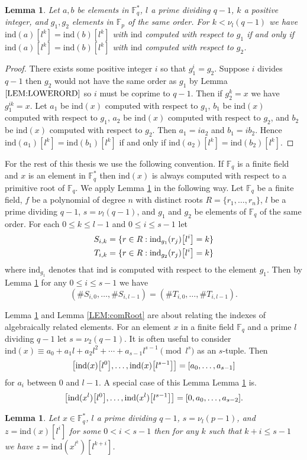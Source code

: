\documentclass{article}
\let\originalleft\left
\let\originalright\right
\renewcommand{\left}{\mathopen{}\mathclose\bgroup\originalleft}
\renewcommand{\right}{\aftergroup\egroup\originalright}
\newcounter{dummy} \numberwithin{dummy}{section}
\theoremstyle{plain}
\newtheorem{lem}[dummy]{Lemma}
\theoremstyle{definition}
\def\Fp {{ \mathbb{F} _ {p} }}
\def\Fq {{ \mathbb{F} _ {q} }}
\def\FQ {{ \mathbb{F}^* _ {q} }}
\def\ind {{ \mathrm{ind} }}
\def\indLa {{\ind (x) \left[l^0\right] }}
\def\indLd {{\ind (x) \left[l^{s-1}\right] }}
\def\indLat {{\ind (x^l) \left[l^0\right] }}
\def\indLdt {{\ind (x^l) \left[l^{s-1}\right] }}
\begin{document}
		\begin{lem}
		\label{LEM:NOGEN}
		    Let $a,b$ be elements in $\FQ$, $l$ a prime dividing $q-1$, $k$ a positive integer, and $g_1,g_2$ elements in $\Fp$ of the same order. For $k<\nu_l(q-1)$ we have $\ind(a)[l^k]=\ind(b)[l^k]$ with $\ind$ computed with respect to $g_1$ if and only if $\ind(a)[l^k]=\ind(b)[l^k]$ with $\ind$ computed with respect to $g_2$.
		\end{lem}
				
		\begin{proof}
		    There exists some positive integer $i$ so that $g_1^i=g_2$. Suppose $i$ divides $q-1$ then $g_2$ would not have the same order as $g_1$ by Lemma $\ref{LEM:LOWERORD}$ so $i$ must be coprime to $q-1$. Then if $g_2^k=x$ we have $g_1^{ik}=x$. Let $a_1$ be $\ind(x)$ computed with respect to $g_1$, $b_1$ be $\ind(x)$ computed with respect to $g_1$, $a_2$ be $\ind(x)$ computed with respect to $g_2$, and $b_2$ be $\ind(x)$ computed with respect to $g_2$. Then $a_1=ia_2$ and $b_1=ib_2$. Hence $\ind(a_1)[l^k]=\ind(b_1)[l^k]$ if and only if $\ind(a_2)[l^k]=\ind(b_2)[l^k]$.
				
		\end{proof}
		
	  For the rest of this thesis we use the following convention. If $\Fq$ is a finite field and $x$ is an element in $\FQ$ then $\ind(x)$ is always computed with respect to a primitive root of $\Fq$. We apply Lemma \ref{LEM:NOGEN} in the following way. Let $\Fq$ be a finite field, $f$ be a polynomial of degree $n$ with distinct roots $R=\{ r_1,\ldots,r_n \}$, $l$ be a prime dividing $q-1$, $s=\nu_l(q-1)$, and $g_1$ and $g_2$ be elements of $\Fq$ of the same order. For each $0 \leq k \leq l-1$ and $0 \leq i \leq s-1$ let	
		\begin{alignat*}{2}
		    S_{i,k} &= \{ r\in R : \ind_{g_1}(r_j)\left[l^i\right] = k \} \\
		    T_{i,k} &= \{ r\in R : \ind_{g_2}(r_j)\left[l^i\right] = k \} 
		\end{alignat*}
		where $\ind_{g_1}$ denotes that $\ind$ is computed with respect to the element $g_1$. Then by Lemma \ref{LEM:NOGEN} for any $0 \leq i \leq s-1$ we have 	
		    \[ ( \#S_{i,0}, \ldots, \#S_{i,l-1} ) = ( \#T_{i,0}, \ldots, \#T_{i,l-1} ) . \]	
		
		Lemma \ref{LEM:leftShift} and Lemma \ref{LEM:comRoot} are about relating the indexes of algebraically related elements. For an element $x$ in a finite field $\Fq$ and a prime $l$ dividing $q-1$ let $s=\nu_2(q-1)$. It is often useful to consider $\ind(x) \equiv a_0 + a_1l + a_2l^2 + \cdots +a_{s-1}l^{s-1} \pmod {l^s}$ as an $s$-tuple. Then 
		    \[ \left[ \indLa,\ldots,\indLd \right] = \left[a_0,\ldots,a_{s-1} \right]\]
		\noindent for $a_i$ between 0 and $l-1$. A special case of this Lemma Lemma \ref{LEM:leftShift} is.
		    \[ \left[ \indLat,\ldots,\indLdt \right] =\left[0,a_0,\ldots,a_{s-2}\right]. \]
		\begin{lem}
		\label{LEM:leftShift}
		    Let $x \in \FQ$, $l$ a prime dividing $q-1$, $s=\nu_l(p-1)$, and $z=\ind(x)[l^i]$ for some $0 < i < s-1$ then for any $k$ such that $k+i \leq s-1$ we have $z=\ind(x^{l^k})[l^{k+i}]$.  
		\end{lem}
		
\end{document}
